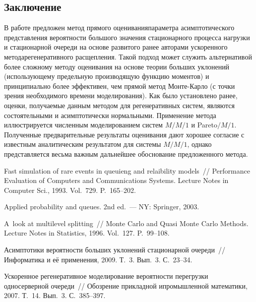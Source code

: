 \begin{multicols}{2}
\section{Заключение}

В  работе предложен метод прямого оценивания\linebreak параметра
асимптотического представления вероятности большого значения
стационарного процесса нагрузки и стационарной очереди  на основе
развитого ранее авторами ускоренного метода\linebreak регенеративного
расщепления.  Такой  подход может служить  альтернативой более
сложному методу оценивания на основе теории больших уклонений
(использующему предельную производящую функцию моментов) и
принципиально  более эффективен, чем прямой метод Монте-Карло (с
точки зрения необходимого времени моделирования).  Как было
установлено ранее, оценки, получаемые данным методом для
регенеративных систем, являются состоятельными и асимптотически
нормальными.  Применение метода иллюстрируется численным
моделированием систем $M/M/1$  и Pareto$/M/1$.  Полученные
предварительные результаты оценивания дают хорошее согласие с
известным аналитическим результатом для  системы $M/M/1$, однако
представляется весьма важным дальнейшее обосно\-ва\-ние предложенного
метода.

{\small\frenchspacing
{%
\begin{thebibliography}{99}


 Fast simulation of rare events in queuieng and
relaibility models~// Performance Evaluation of Computers and
Communications Systems.  Lecture Notes in Computer Sci., 1993. Vol.~729. P.~165--202.

  Applied probability and queues. 2nd ed.~--- NY: Springer,
2003.

A~look at multilevel splitting~// Monte Carlo and Quasi Monte Carlo
Methods. Lecture Notes in Statistics, 1996. Vol.~127. P.~99--108.

 Асимптотики вероятности
больших уклонений стационарной очереди~// Информатика и её
применения, 2009. Т.~3. Вып.~3. С.~23--34.

 
 Ускоренное регенеративное моделирование вероятности перегрузки односерверной
    очереди~// Обозрение прикладной и\linebreak промышленной математики, 2007. Т.~14. Вып.~3. С.~385--397.


\end{thebibliography}}}
\end{multicols}
